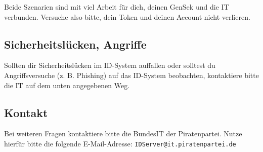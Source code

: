 Beide Szenarien sind mit viel Arbeit für dich, deinen GenSek und die IT verbunden.
Versuche also bitte, dein Token und deinen Account nicht verlieren.

\subsection{Sicherheitslücken, Angriffe}
Sollten dir Sicherheitslücken im ID-System auffallen oder solltest du Angriffsversuche (z. B. Phishing) auf das ID-System beobachten,
kontaktiere bitte die IT auf dem unten angegebenen Weg.

\subsection{Kontakt}
Bei weiteren Fragen kontaktiere bitte die BundesIT der Piratenpartei.
Nutze hierfür bitte die folgende E-Mail-Adresse:
\verb=IDServer@it.piratenpartei.de=

